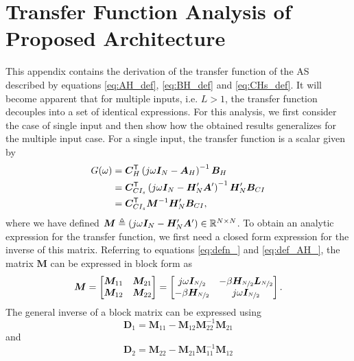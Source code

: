 
\chapter{Transfer Function Analysis of Proposed Architecture}
\label{a:tf_analysis}
This appendix contains the derivation of the transfer function of the AS described by equations \ref{eq:AH_def}, \ref{eq:BH_def} and \ref{eq:CHs_def}. It will become apparent that for multiple inputs, i.e. $L>1$, the transfer function decouples into a set of identical expressions. For this analysis, we first consider the case of single input and then show how the obtained results generalizes for the multiple input case. For a single input, the transfer function is a scalar given by
\begin{align}
    G(\omega) & = \bm{C}^\mathsf{T}_{H} \left( j\omega \bm{I}_{N} - \bm{A}_H \right)^{-1} \bm{B}_H \\
                   & = \bm{C}^\mathsf{T}_{CI_s} \left( j\omega \bm{I}_{N} - \bm{H_}{N}' \bm{A}' \right)^{-1} \bm{H_}{N}' \bm{B}_{CI} \\
                   & = \bm{C}^\mathsf{T}_{CI_s} \bm{M}^{-1} \bm{H_}{N}' \bm{B}_{CI},
\end{align}
where we have defined $\bm{M} \triangleq \left( j\omega \bm{I}_{N} - \bm{H_}{N}' \bm{A}' \right) \in \mathbb{R}^{N \times N}$. To obtain an analytic expression for the transfer function, we first need a closed form expression for the inverse of this matrix. Referring to equations \ref{eq:defn_} and \ref{eq:def_AH_}, the matrix $\bm{M}$ can be expressed in block form as
\begin{equation}
    \bm{M} =
    \begin{bmatrix}
        \bm{M}_{11} & \bm{M}_{21} \\
        \bm{M}_{12} & \bm{M}_{22}
    \end{bmatrix}
    =
    \begin{bmatrix}
        j\omega \bm{I}_{\nicefrac{N}{2}} & -\beta\bm{H_}{\nicefrac{N}{2}}\bm{L}_{\nicefrac{N}{2}} \\
        -\beta \bm{H_}{\nicefrac{N}{2}}    & j\omega\bm{I}_{\nicefrac{N}{2}}
    \end{bmatrix}.
\end{equation}
The general inverse of a block matrix can be expressed using
\begin{equation}
    \label{eq:def_D1}
        \bm{D}_1 = \bm{M}_{11} - \bm{M}_{12}\bm{M}_{22}^{-1}\bm{M}_{21}
\end{equation}
and
\begin{equation}
    \label{eq:def_D2}
        \bm{D}_2 = \bm{M}_{22} - \bm{M}_{21}\bm{M}_{11}^{-1}\bm{M}_{12}
\end{equation}

